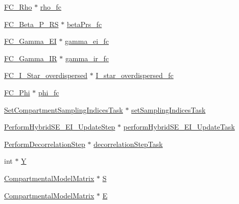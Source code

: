 \begin{DoxyCompactItemize}
\hyperlink{classSpatialSEIR_1_1FC__Rho}{F\-C\-\_\-\-Rho} $\ast$ \hyperlink{classSpatialSEIR_1_1ModelContext_a894f23aa95ff98664b2cf71443cde6e5}{rho\-\_\-fc}
\item 
\hyperlink{classSpatialSEIR_1_1FC__Beta__P__RS}{F\-C\-\_\-\-Beta\-\_\-\-P\-\_\-\-R\-S} $\ast$ \hyperlink{classSpatialSEIR_1_1ModelContext_a9eb52c439f5b00fe5926297f45484bd3}{beta\-Prs\-\_\-fc}
\item 
\hyperlink{classSpatialSEIR_1_1FC__Gamma__EI}{F\-C\-\_\-\-Gamma\-\_\-\-E\-I} $\ast$ \hyperlink{classSpatialSEIR_1_1ModelContext_a6973164c7a807aea76f3bab1f4403cd5}{gamma\-\_\-ei\-\_\-fc}
\item 
\hyperlink{classSpatialSEIR_1_1FC__Gamma__IR}{F\-C\-\_\-\-Gamma\-\_\-\-I\-R} $\ast$ \hyperlink{classSpatialSEIR_1_1ModelContext_a9293a2cef5007f0f4510072fb3babbf1}{gamma\-\_\-ir\-\_\-fc}
\item 
\hyperlink{classSpatialSEIR_1_1FC__I__Star__overdispersed}{F\-C\-\_\-\-I\-\_\-\-Star\-\_\-overdispersed} $\ast$ \hyperlink{classSpatialSEIR_1_1ModelContext_a7c02046540bcf230845d6d6821148d67}{I\-\_\-star\-\_\-overdispersed\-\_\-fc}
\item 
\hyperlink{classSpatialSEIR_1_1FC__Phi}{F\-C\-\_\-\-Phi} $\ast$ \hyperlink{classSpatialSEIR_1_1ModelContext_a97d54a9e4778575b5c88264f88831fc4}{phi\-\_\-fc}
\item 
\hyperlink{classSpatialSEIR_1_1SetCompartmentSamplingIndicesTask}{Set\-Compartment\-Sampling\-Indices\-Task} $\ast$ \hyperlink{classSpatialSEIR_1_1ModelContext_abc04b849ec0d819b9a4893862348a606}{set\-Sampling\-Indices\-Task}
\item 
\hyperlink{classSpatialSEIR_1_1PerformHybridSE__EI__UpdateStep}{Perform\-Hybrid\-S\-E\-\_\-\-E\-I\-\_\-\-Update\-Step} $\ast$ \hyperlink{classSpatialSEIR_1_1ModelContext_ae27950c823d73953740dd8e2267638af}{perform\-Hybrid\-S\-E\-\_\-\-E\-I\-\_\-\-Update\-Task}
\item 
\hyperlink{classSpatialSEIR_1_1PerformDecorrelationStep}{Perform\-Decorrelation\-Step} $\ast$ \hyperlink{classSpatialSEIR_1_1ModelContext_a0b5cd5089cd6b9ebf3034387406dccb2}{decorrelation\-Step\-Task}
\item 
int $\ast$ \hyperlink{classSpatialSEIR_1_1ModelContext_a21143ccd9b787ff4a42c83cdb2b81a80}{Y}
\item 
\hyperlink{classSpatialSEIR_1_1CompartmentalModelMatrix}{Compartmental\-Model\-Matrix} $\ast$ \hyperlink{classSpatialSEIR_1_1ModelContext_afa683f7f79821d957107d301dfe392c1}{S}
\item 
\hyperlink{classSpatialSEIR_1_1CompartmentalModelMatrix}{Compartmental\-Model\-Matrix} $\ast$ \hyperlink{classSpatialSEIR_1_1ModelContext_ad5128cd85f8a1005b11a97c6ff7894e1}{E}

\end{DoxyCompactItemize}
